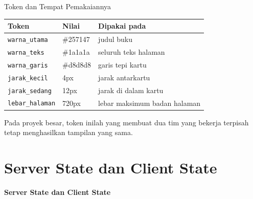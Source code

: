 \documentclass[aspectratio=169, table, 12pt]{beamer}
\begin{document}
\begin{frame}{{\Large Token dan Tempat Pemakaiannya}}
  \vspace{6pt}
  \centering
  {\footnotesize
  \begin{tabularx}{\textwidth}{llY}
    \hline
    \textbf{Token} & \textbf{Nilai} & \textbf{Dipakai pada} \\
    \hline
    \texttt{warna\_utama} & \#257147 & judul buku \\
    \hline
    \texttt{warna\_teks} & \#1a1a1a & seluruh teks halaman \\
    \hline
    \texttt{warna\_garis} & \#d8d8d8 & garis tepi kartu \\
    \hline
    \texttt{jarak\_kecil} & 4px & jarak antarkartu \\
    \hline
    \texttt{jarak\_sedang} & 12px & jarak di dalam kartu \\
    \hline
    \texttt{lebar\_halaman} & 720px & lebar maksimum badan halaman \\
    \hline
  \end{tabularx}}

  \vspace{6pt}
  {\small Pada proyek besar, token inilah yang membuat dua tim yang bekerja
  terpisah tetap menghasilkan tampilan yang sama.}
\end{frame}

\section{Server State dan Client State}

\begin{frame}{\hfill}
  \centering
  \Huge{\textbf{Server State dan Client State}}
\end{frame}
\end{document}
